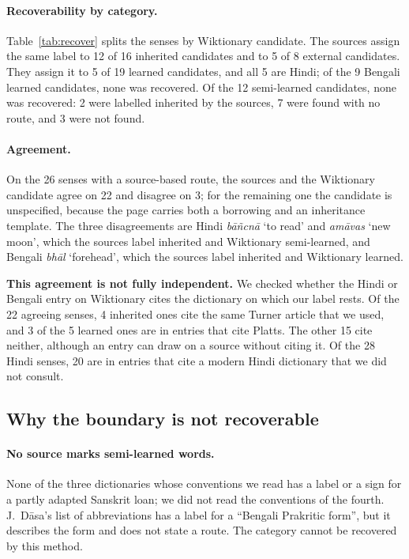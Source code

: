 \documentclass[11pt]{article}
\newcommand{\gl}[1]{`#1'}
\begin{document}
\paragraph{Recoverability by category.} Table~\ref{tab:recover} splits the senses by Wiktionary candidate. The sources assign the same label to 12 of 16 inherited candidates and to 5 of 8 external candidates. They assign it to 5 of 19 learned candidates, and all 5 are Hindi; of the 9 Bengali learned candidates, none was recovered. Of the 12 semi-learned candidates, none was recovered: 2 were labelled inherited by the sources, 7 were found with no route, and 3 were not found.

\paragraph{Agreement.} On the 26 senses with a source-based route, the sources and the Wiktionary candidate agree on 22 and disagree on 3; for the remaining one the candidate is unspecified, because the page carries both a borrowing and an inheritance template. The three disagreements are Hindi \textit{b\=a\~ncn\=a} \gl{to read} and \textit{am\=avas} \gl{new moon}, which the sources label inherited and Wiktionary semi-learned, and Bengali \textit{bh\=al} \gl{forehead}, which the sources label inherited and Wiktionary learned.

\textbf{This agreement is not fully independent.} We checked whether the Hindi or Bengali entry on Wiktionary cites the dictionary on which our label rests. Of the 22 agreeing senses, 4 inherited ones cite the same Turner article that we used, and 3 of the 5 learned ones are in entries that cite Platts. The other 15 cite neither, although an entry can draw on a source without citing it. Of the 28 Hindi senses, 20 are in entries that cite a modern Hindi dictionary that we did not consult.

\subsection{Why the boundary is not recoverable}

\paragraph{No source marks semi-learned words.} None of the three dictionaries whose conventions we read has a label or a sign for a partly adapted Sanskrit loan; we did not read the conventions of the fourth. J.~D\=asa's list of abbreviations has a label for a ``Bengali Prakritic form'', but it describes the form and does not state a route. The category cannot be recovered by this method.
\end{document}
